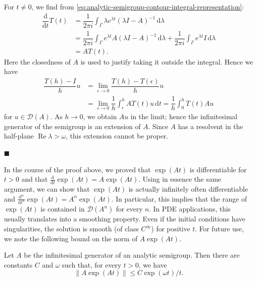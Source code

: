 \begingroup
\renewenvironment{Proof}{\par}{\par\nobreak\hfill$\blacksquare$\par\vspace{0.1cm}}
\begin{Proof}
For $t\neq0$, we find from \eqref{eq:analytic-semigroup-contour-integral-representation}:\[\begin{aligned}
\dfrac{\mathrm{d}}{\mathrm{d}t}T(t)&=\dfrac{1}{2\pi i}\int_\Gamma\lambda e^{\lambda t}(\lambda I-A)^{-1}\,\mathrm{d}\lambda\\
&=\dfrac{1}{2\pi i}\int_\Gamma e^{\lambda t}A(\lambda I-A)^{-1}\,\mathrm{d}\lambda+\dfrac{1}{2\pi i}\int_\Gamma e^{\lambda t}I\,\mathrm{d}\lambda\\
&=AT(t).
\end{aligned}\]Here the closedness of $A$ is used to justify taking it outside the integral. Hence we have\[\begin{aligned}
\dfrac{T(h)-I}{h}u&=\lim_{\epsilon\to0}\dfrac{T(h)-T(\epsilon)}{h}u\\
&=\lim_{\epsilon\to0}\dfrac{1}{h}\int_\epsilon^h AT(t)u\,\mathrm{d}t=\dfrac{1}{h}\int_0^h T(t)Au
\end{aligned}\]for $u\in\mathcal{D}(A)$. As $h\to0$, we obtain $Au$ in the limit; hence the infinitesimal generator of the semigroup is an extension of $A$. Since $A$ has a resolvent in the half-plane $\operatorname{Re}\lambda>\omega$, this extension cannot be proper.
\end{Proof}
\endgroup

In the course of the proof above, we proved that $\exp(At)$ is differentiable for $t>0$ and that $\frac{\mathrm{d}}{\mathrm{d}t}\exp(At)=A\exp(At)$. Using in essence the same argument, we can show that $\exp(At)$ is actually infinitely often differentiable and $\frac{\mathrm{d}^n}{\mathrm{d}t^n}\exp(At)=A^n\exp(At)$. In particular, this implies that the range of $\exp(At)$ is contained in $\mathcal{D}(A^n)$ for every $n$. In PDE applications, this usually translates into a smoothing property. Even if the initial conditions have singularities, the solution is smooth (of class $C^\infty$) for positive $t$. For future use, we note the following bound on the norm of $A\exp(At)$.

\begin{Lemma}
\label{lem:analytic-semigroup-time-derivative-bound}
Let $A$ be the infinitesimal generator of an analytic semigroup. Then there are constants $C$ and $\omega$ such that, for every $t>0$, we have
\begin{equation}\label{eq:analytic-semigroup-generator-time-derivative-bound}
\|A\exp(At)\|\leq C\exp(\omega t)/t.
\end{equation}

\end{Lemma}

